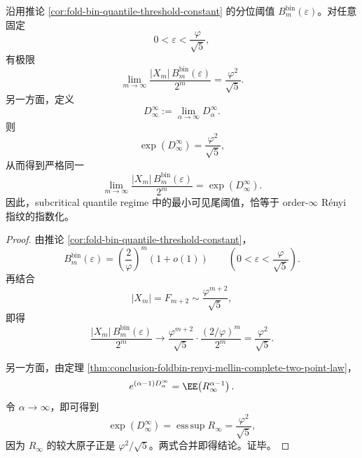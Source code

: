 \begin{corollary}\label{cor:conclusion-foldbin-quantile-threshold-renyi-infty-unification}
沿用推论 \ref{cor:fold-bin-quantile-threshold-constant} 的分位阈值 \(B_m^{\mathrm{bin}}(\varepsilon)\)。对任意固定
\[
0<\varepsilon<\frac{\varphi}{\sqrt5},
\]
有极限
\[
\lim_{m\to\infty}\frac{|X_m|\,B_m^{\mathrm{bin}}(\varepsilon)}{2^m}
=
\frac{\varphi^2}{\sqrt5}.
\]
另一方面，定义
\[
D_\infty^\infty:=\lim_{\alpha\to\infty}D_\alpha^\infty.
\]
则
\[
\exp(D_\infty^\infty)=\frac{\varphi^2}{\sqrt5},
\]
从而得到严格同一
\[
\lim_{m\to\infty}\frac{|X_m|\,B_m^{\mathrm{bin}}(\varepsilon)}{2^m}
=
\exp(D_\infty^\infty).
\]
因此，subcritical quantile regime 中的最小可见尾阈值，恰等于 order-\(\infty\) Rényi 指纹的指数化。
\end{corollary}
\begin{proof}
由推论 \ref{cor:fold-bin-quantile-threshold-constant}，
\[
B_m^{\mathrm{bin}}(\varepsilon)
=
\left(\frac{2}{\varphi}\right)^m(1+o(1))
\qquad
\left(0<\varepsilon<\frac{\varphi}{\sqrt5}\right).
\]
再结合
\[
|X_m|=F_{m+2}\sim \frac{\varphi^{m+2}}{\sqrt5},
\]
即得
\[
\frac{|X_m|\,B_m^{\mathrm{bin}}(\varepsilon)}{2^m}
\longrightarrow
\frac{\varphi^{m+2}}{\sqrt5}\cdot\frac{(2/\varphi)^m}{2^m}
=
\frac{\varphi^2}{\sqrt5}.
\]

另一方面，由定理 \ref{thm:conclusion-foldbin-renyi-mellin-complete-two-point-law}，
\[
e^{(\alpha-1)D_\alpha^\infty}
=
\EE\!\left(R_\infty^{\alpha-1}\right).
\]
令 \(\alpha\to\infty\)，即可得到
\[
\exp(D_\infty^\infty)
=
\operatorname*{ess\,sup}R_\infty
=
\frac{\varphi^2}{\sqrt5},
\]
因为 \(R_\infty\) 的较大原子正是 \(\varphi^2/\sqrt5\)。两式合并即得结论。证毕。
\end{proof}

